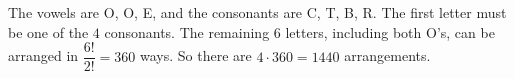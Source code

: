 The vowels are O, O, E, and the consonants are C, T, B, R. The first letter must be one of the $4$ consonants. The remaining $6$ letters, including both O's, can be arranged in $\dfrac{6!}{2!}=360$ ways. So there are $4\cdot360=\boxed{1440}$ arrangements.
